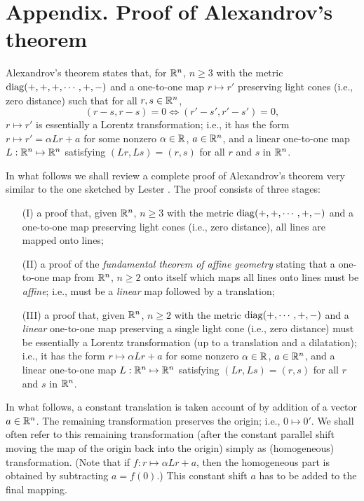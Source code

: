 \section*{Appendix. Proof of Alexandrov's theorem}

Alexandrov's theorem states that,
for ${\Bbb R}^n$, $n\ge 3$ with the metric ${\rm diag}(+,+,+,\cdots ,+,-)$
and a one-to-one map $r\mapsto r'$ preserving light cones (i.e., zero distance)
such that  for all $r,s\in  {\Bbb R}^n$,
$$(r-s,r-s)=0 \Longleftrightarrow (r'-s',r'-s')=0,$$
$r\mapsto r'$ is essentially a Lorentz transformation;
i.e., it has the form $r\mapsto r'=\alpha Lr+a$ for some nonzero $\alpha \in {\Bbb R}$,
$a\in {\Bbb R}^n$,
and a linear one-to-one map $L:{\Bbb R}^n\mapsto {\Bbb R}^n$ satisfying $(Lr,Ls)=(r,s)$ for all $r$
and $s$ in ${\Bbb R}^n$.


In what follows we shall review a complete proof of Alexandrov's theorem
very similar to the one sketched by Lester   \cite{lester}.
The proof consists of three stages:
\begin{itemize}
\item[(I)] a proof that, given ${\Bbb R}^n$, $n\ge 3$ with the metric ${\rm diag}(+,+,\cdots ,+,-)$
and a one-to-one map preserving light cones (i.e., zero distance),
all lines are mapped onto lines;

\item[(II)] a proof of the {\em fundamental theorem of affine geometry} stating that
a one-to-one map from ${\Bbb R}^n$, $n\ge 2$ onto itself which maps all lines onto lines must be {\em affine};
i.e., must be a {\em linear} map followed by a translation;

\item[(III)] a proof that, given ${\Bbb R}^n$, $n\ge 2$ with the metric ${\rm diag}(+,\cdots ,+,-)$
and a {\em linear} one-to-one map preserving a single light cone (i.e., zero distance)
must be essentially a Lorentz transformation (up to a translation and a dilatation);
i.e., it has the form $r\mapsto \alpha Lr+a$ for some nonzero $\alpha \in {\Bbb R}$,
$a\in {\Bbb R}^n$,
and a linear one-to-one map $L:{\Bbb R}^n\mapsto {\Bbb R}^n$ satisfying $(Lr,Ls)=(r,s)$ for all $r$
and $s$ in ${\Bbb R}^n$.
\end{itemize}


In what follows, a constant translation is
taken account of by addition of a vector $a\in {\Bbb R}^n$.
The remaining transformation preserves the origin; i.e.,
$0\mapsto 0'$.
We shall often refer to this remaining transformation
(after the constant parallel shift moving the map of the origin back into the origin)
simply as (homogeneous) transformation.
(Note that if $f:r\mapsto \alpha L r+a$, then the homogeneous part
is obtained by subtracting $a=f(0)$.)
This  constant shift $a$ has to be added to the final mapping.

